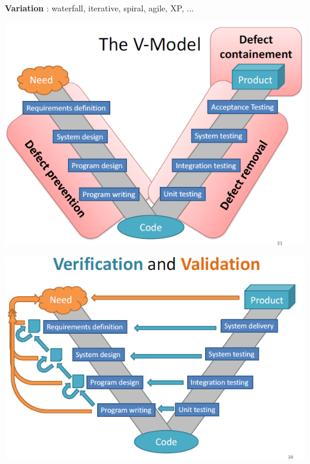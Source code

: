\documentclass{article}
\begin{document}
\noindent \textbf{Variation} : waterfall,
iterative,
spiral,
agile,
XP, ...

\begin{multicols}{2}
\begin{center}
    \includegraphics[scale = 0.4]{image/3.PNG}
\end{center}
\vfill\null
\columnbreak
\begin{center}
    \includegraphics[scale = 0.4]{image/4.PNG}
\end{center}
\end{multicols}
\vspace{-1.2cm}
\end{document}
